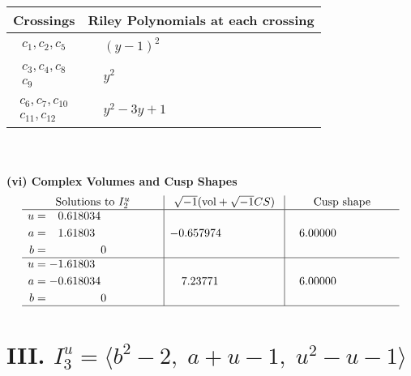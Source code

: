 \documentclass[1p]{elsarticle_modified}
\theoremstyle{definition}
\newcommand{\I}{\sqrt{-1}}
\begin{document}
\begin{tabular}{m{50pt}|m{274pt}}
Crossings & \hspace{64pt}Riley Polynomials at each crossing \\
\hline $$\begin{aligned}c_{1},c_{2},c_{5}\end{aligned}$$&$\begin{aligned}
&(y-1)^2
\end{aligned}$\\
\hline $$\begin{aligned}c_{3},c_{4},c_{8}\\c_{9}\end{aligned}$$&$\begin{aligned}
&y^2
\end{aligned}$\\
\hline $$\begin{aligned}c_{6},c_{7},c_{10}\\c_{11},c_{12}\end{aligned}$$&$\begin{aligned}
&y^2-3 y+1
\end{aligned}$\\
\hline
\end{tabular}\\~\\
\newpage\flushleft \textbf{(vi) Complex Volumes and Cusp Shapes}
$$\begin{array}{c|c|c}  
\text{Solutions to }I^u_{2}& \I (\text{vol} + \sqrt{-1}CS) & \text{Cusp shape}\\
 \hline 
\begin{aligned}
u &= \phantom{-}0.618034\phantom{ +0.000000I} \\
a &= \phantom{-}1.61803\phantom{ +0.000000I} \\
b &= \phantom{-0.000000 } 0\end{aligned}
 & -0.657974\phantom{ +0.000000I} & \phantom{-}6.00000\phantom{ +0.000000I} \\ \hline\begin{aligned}
u &= -1.61803\phantom{ +0.000000I} \\
a &= -0.618034\phantom{ +0.000000I} \\
b &= \phantom{-0.000000 } 0\end{aligned}
 & \phantom{-}7.23771\phantom{ +0.000000I} & \phantom{-}6.00000\phantom{ +0.000000I}\\
 \hline 
 \end{array}$$\newpage\newpage\renewcommand{\arraystretch}{1}
\centering \section*{III. $I^u_{3}= \langle b^2-2,\;a+u-1,\;u^2- u-1 \rangle$}
\end{document}
